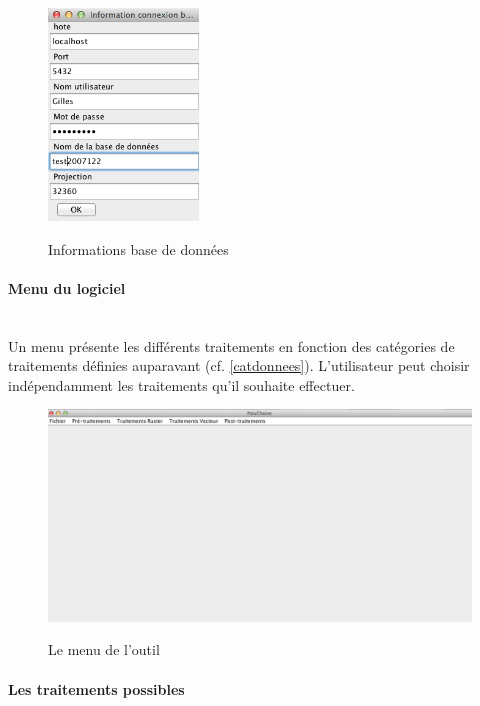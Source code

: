 \begin{figure}[H]
\begin{center}
\includegraphics[width=4cm]{Logiciel2}\\
\caption{\label{Traitement2}Informations base de données}
\end{center}
\end{figure}

\paragraph{Menu du logiciel\\\\}

Un menu présente les différents traitements en fonction des catégories de traitements définies  auparavant (cf. \ref{catdonnees}). L'utilisateur peut choisir indépendamment les traitements qu'il souhaite effectuer. 

\begin{figure}[H]
\begin{center}
\includegraphics[width=12cm]{Logiciel3}\\
\caption{\label{Traitement2}Le menu de l'outil}
\end{center}
\end{figure}


\paragraph{Les traitements possibles\\\\}

